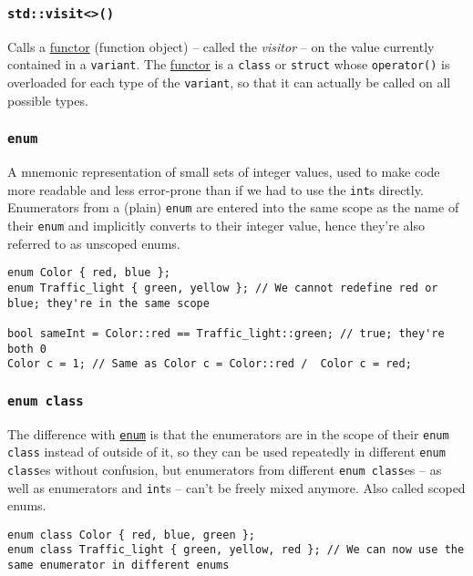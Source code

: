 \documentclass[8pt, table, xcdraw]{article}%
\begin{document}
\subsubsection{\lstinline{std::visit<>()}}

Calls a \hyperref[functors]{functor} (function object) -- called the \emph{visitor} -- on the value currently contained in a \lstinline{variant}. The \hyperref[functors]{functor} is a \lstinline{class} or \lstinline{struct} whose \lstinline{operator()} is overloaded for each type of the \lstinline{variant}, so that it can actually be called on all possible types.

\subsubsection{\lstinline{enum}} \label{enum}
A mnemonic representation of small sets of integer values, used to make code more readable and less error-prone than if we had to use the \lstinline{int}s directly. Enumerators from a (plain) \lstinline{enum} are entered into the same scope as the name of their \lstinline{enum} and implicitly converts to their integer value, hence they're also referred to as unscoped enums.

\begin{lstlisting}
enum Color { red, blue };
enum Traffic_light { green, yellow }; // We cannot redefine red or blue; they're in the same scope

bool sameInt = Color::red == Traffic_light::green; // true; they're both 0
Color c = 1; // Same as Color c = Color::red /  Color c = red;
\end{lstlisting}

\subsubsection{\lstinline{enum class}}
The difference with \hyperref[enum]{\lstinline{enum}} is that the enumerators are in the scope of their \lstinline{enum class} instead of outside of it, so they can be used repeatedly in different \lstinline{enum class}es without confusion, but enumerators from different \lstinline{enum class}es -- as well as enumerators and \lstinline{int}s -- can't be freely mixed anymore. Also called scoped enums.

\begin{lstlisting}
enum class Color { red, blue, green };
enum class Traffic_light { green, yellow, red }; // We can now use the same enumerator in different enums
\end{lstlisting}
\end{document}
